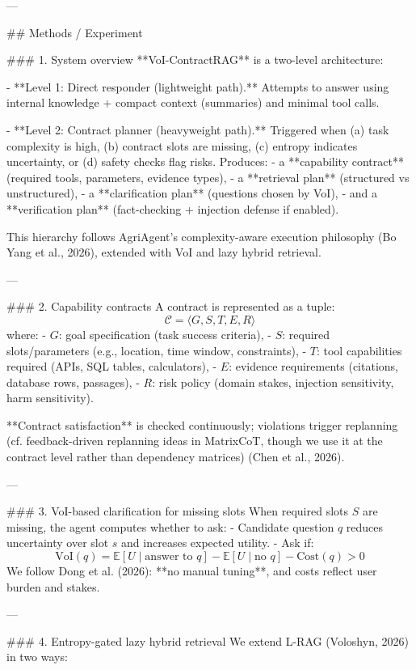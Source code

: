 ---

## Methods / Experiment

### 1. System overview
**VoI-ContractRAG** is a two-level architecture:

- **Level 1: Direct responder (lightweight path).**  
  Attempts to answer using internal knowledge + compact context (summaries) and minimal tool calls.

- **Level 2: Contract planner (heavyweight path).**  
  Triggered when (a) task complexity is high, (b) contract slots are missing, (c) entropy indicates uncertainty, or (d) safety checks flag risks. Produces:
  - a **capability contract** (required tools, parameters, evidence types),
  - a **retrieval plan** (structured vs unstructured),
  - a **clarification plan** (questions chosen by VoI),
  - and a **verification plan** (fact-checking + injection defense if enabled).

This hierarchy follows AgriAgent’s complexity-aware execution philosophy (Bo Yang et al., 2026), extended with VoI and lazy hybrid retrieval.

---

### 2. Capability contracts
A contract is represented as a tuple:
\[
\mathcal{C} = \langle G, S, T, E, R \rangle
\]
where:
- \(G\): goal specification (task success criteria),
- \(S\): required slots/parameters (e.g., location, time window, constraints),
- \(T\): tool capabilities required (APIs, SQL tables, calculators),
- \(E\): evidence requirements (citations, database rows, passages),
- \(R\): risk policy (domain stakes, injection sensitivity, harm sensitivity).

**Contract satisfaction** is checked continuously; violations trigger replanning (cf. feedback-driven replanning ideas in MatrixCoT, though we use it at the contract level rather than dependency matrices) (Chen et al., 2026).

---

### 3. VoI-based clarification for missing slots
When required slots \(S\) are missing, the agent computes whether to ask:
- Candidate question \(q\) reduces uncertainty over slot \(s\) and increases expected utility.
- Ask if:
\[
\mathrm{VoI}(q) = \mathbb{E}[U \mid \text{answer to } q] - \mathbb{E}[U \mid \text{no } q] - \mathrm{Cost}(q) > 0
\]
We follow Dong et al. (2026): **no manual tuning**, and costs reflect user burden and stakes.

---

### 4. Entropy-gated lazy hybrid retrieval
We extend L-RAG (Voloshyn, 2026) in two ways:

